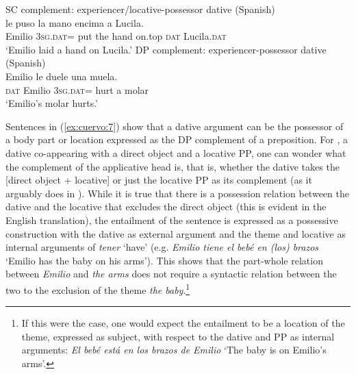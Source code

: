 \documentclass[output=paper,colorlinks,citecolor=brown,modfonts,nonflat]{langsci/langscibook}
\begin{document}
\ea%
    \label{ex:cuervo:8}
    \ea%
        \label{ex:cuervo:8a}
        SC complement: experiencer/locative-possessor dative   (Spanish)\\
         {le} {puso} {la} {mano} {encima}{\footnotemark} {a} {Lucila}.\\
        Emilio 3\textsc{sg.dat}= put   the hand on.top  \textsc{dat} Lucila.\textsc{dat}\\
        \glt ‘Emilio laid a hand on Lucila.’
    \ex%
        \label{ex:cuervo:8b}
        DP complement: experiencer-possessor dative (Spanish)\\
         {Emilio} {le} {duele} {una} {muela}.\\
        \textsc{dat} Emilio 3\textsc{sg.dat}= hurt a molar\\
        \glt ‘Emilio’s molar hurts.’
    \z
\z

Sentences in (\ref{ex:cuervo:7}) show that a dative argument can be the possessor of a body part or location expressed as the DP complement of a preposition. For , a dative co-appearing with a direct object and a locative PP, one can wonder what the complement of the applicative head is, that is, whether the dative takes the [direct object + locative] or just the locative PP as its complement (as it arguably does in ). While it is true that there is a possession relation between the dative and the locative that excludes the direct object (this is evident in the English translation), the entailment of the sentence is expressed as a possessive construction with the dative as external argument and the theme and locative as internal arguments of \textit{tener} ‘have’ (e.g. \textit{Emilio tiene el bebé en (los) brazos} ‘Emilio has the baby on his arms’).  This shows that the part-whole relation between \textit{Emilio} and \textit{the arms} does not require a syntactic relation between the two to the exclusion of the theme \textit{the baby}.\footnote{If this were the case, one would expect the entailment to be a location of the theme, expressed as subject, with respect to the dative and PP as internal arguments: \textit{El bebé está en los brazos de Emilio} ‘The baby is on Emilio’s arms’.}
\end{document}
